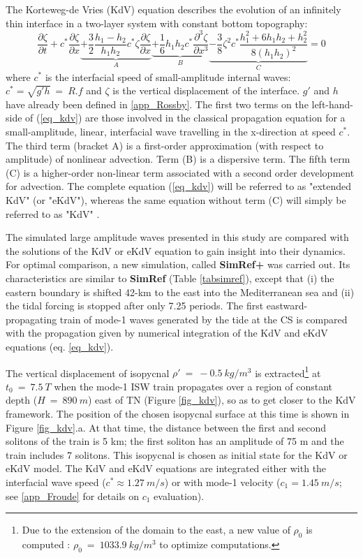 The Korteweg-de Vries (KdV) equation describes the evolution of an infinitely thin interface in a two-layer system with constant bottom topography:
\begin{equation}
\frac{\partial \zeta}{\partial t} 
+c^* \frac{\partial \zeta}{\partial x}
\underbrace{+ \frac{3}{2} \frac{h_1-h_2}{h_1h_2} c^* \zeta \frac{\partial \zeta}{\partial x} }_{A}
\underbrace{+ \frac{1}{6} h_1h_2c^* \frac{\partial ^3 \zeta}{\partial x^3} }_{B}
\underbrace{ - \frac{3}{8}\zeta^2c^*\frac{h_1^2+6h_1h_2+h_2^2}{8(h_1h_2)^2} }_{C}
=0
\label{eq_kdv}
\end{equation}
where $c^*$ is the interfacial speed of small-amplitude internal waves: $c^*=\sqrt{g' h}\ = \ R.f$ and $\zeta$ is the vertical displacement of the interface. $g'$ and $h$ have already been defined in \ref{app_Rossby}.
%
The first two terms on the left-hand-side of (\ref{eq_kdv}) are those involved in the classical propagation equation for a small-amplitude, linear, interfacial wave travelling in the x-direction at speed $c^*$. The third term (bracket A) is a first-order approximation (with respect to amplitude) of nonlinear advection. Term (B) is a dispersive term.
%
The fifth term (C) is a higher-order non-linear term associated with a second order development for advection. The complete equation (\ref{eq_kdv}) will be referred to as "extended KdV" (or "eKdV"), whereas the same equation without term (C) will simply be referred to as "KdV" \citep{Dossmann2012}.

The simulated large amplitude waves presented in this study are compared with the solutions of the KdV or eKdV equation to gain insight into their dynamics. For optimal comparison, a new simulation, called \textbf{SimRef+} was carried out. Its characteristics are similar to \textbf{SimRef} (Table \ref{tabsimref}), except that (i) the eastern boundary is shifted 42-km to the east into the Mediterranean sea and (ii) the tidal forcing is stopped after only 7.25 periods. The first eastward-propagating train of mode-1 waves generated by the tide at the CS is compared with the propagation given by numerical integration of the KdV and eKdV equations (eq. \ref{eq_kdv}).

The vertical displacement of isopycnal $\rho'\ =\ -0.5\ kg/m^3$ is extracted\footnote{Due to the extension of the domain to the east, a new value of $\rho_0$ is computed : $\rho_0\ =\ 1033.9 \ kg/m^3$ to optimize computations.} at $t_0\ =\ 7.5\ T$ when the mode-1 ISW train propagates over a region of constant depth ($H\ =\ 890\ m$) east of TN (Figure \ref{fig_kdv}), so as to get closer to the KdV framework. The position of the chosen isopycnal surface at this time is shown in Figure \ref{fig_kdv}.a. At that time, the distance between the first and second solitons of the train is 5 km; the first soliton has an amplitude of 75 m and the train includes 7 solitons. This isopycnal is chosen as initial state for the KdV or eKdV model. 
%
The KdV and eKdV equations are integrated either with the interfacial wave speed ($c^* \approx 1.27\ m/s$) or with mode-1 velocity ($c_1 = 1.45\ m/s$; see \ref{app_Froude} for details on $c_1$ evaluation).

